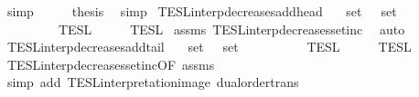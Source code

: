 \begin{isabellebody}
\ simp\isanewline
\ \ \isamarkupfalse%
\ \isamarkupfalse%
\ {\isacharquery}thesis\ \isamarkupfalse%
\ simp\isanewline
{}\isamarkupfalse%
%
\endisatagproof
{\isafoldproof}%
%
\isadelimproof
\isanewline
%
\endisadelimproof
\isanewline
{}\isamarkupfalse%
\ TESL{\isacharunderscore}interp{\isacharunderscore}decreases{\isacharunderscore}add{\isacharunderscore}head{\isacharcolon}\isanewline
\ \ \ {\isacartoucheopen}set\ {\isasymPhi}\ {\isasymsubseteq}\ set\ {\isasymPhi}{\isacharprime}{\isacartoucheclose}\isanewline
\ \ \ \ \ {\isacartoucheopen}{\isasymlbrakk}{\isasymlbrakk}\ {\isasymphi}\ {\isacharhash}\ {\isasymPhi}\ {\isasymrbrakk}{\isasymrbrakk}\isactrlsub T\isactrlsub E\isactrlsub S\isactrlsub L\ {\isasymsupseteq}\ {\isasymlbrakk}{\isasymlbrakk}\ {\isasymphi}\ {\isacharhash}\ {\isasymPhi}{\isacharprime}\ {\isasymrbrakk}{\isasymrbrakk}\isactrlsub T\isactrlsub E\isactrlsub S\isactrlsub L{\isacartoucheclose}\isanewline
%
\isadelimproof
%
\endisadelimproof
%
\isatagproof
{}\isamarkupfalse%
\ assms\ TESL{\isacharunderscore}interp{\isacharunderscore}decreases{\isacharunderscore}setinc\ \isamarkupfalse%
\ auto%
\endisatagproof
{\isafoldproof}%
%
\isadelimproof
\isanewline
%
\endisadelimproof
\isanewline
{}\isamarkupfalse%
\ TESL{\isacharunderscore}interp{\isacharunderscore}decreases{\isacharunderscore}add{\isacharunderscore}tail{\isacharcolon}\isanewline
\ \ \ {\isacartoucheopen}set\ {\isasymPhi}\ {\isasymsubseteq}\ set\ {\isasymPhi}{\isacharprime}{\isacartoucheclose}\isanewline
\ \ \ \ \ {\isacartoucheopen}{\isasymlbrakk}{\isasymlbrakk}\ {\isasymPhi}\ {\isacharat}\ {\isacharbrackleft}{\isasymphi}{\isacharbrackright}\ {\isasymrbrakk}{\isasymrbrakk}\isactrlsub T\isactrlsub E\isactrlsub S\isactrlsub L\ {\isasymsupseteq}\ {\isasymlbrakk}{\isasymlbrakk}\ {\isasymPhi}{\isacharprime}\ {\isacharat}\ {\isacharbrackleft}{\isasymphi}{\isacharbrackright}\ {\isasymrbrakk}{\isasymrbrakk}\isactrlsub T\isactrlsub E\isactrlsub S\isactrlsub L{\isacartoucheclose}\isanewline
%
\isadelimproof
%
\endisadelimproof
%
\isatagproof
{}\isamarkupfalse%
\ TESL{\isacharunderscore}interp{\isacharunderscore}decreases{\isacharunderscore}setinc{\isacharbrackleft}OF\ assms{\isacharbrackright}\ \isanewline
\ \ \isamarkupfalse%
\ {\isacharparenleft}simp\ add{\isacharcolon}\ TESL{\isacharunderscore}interpretation{\isacharunderscore}image\ dual{\isacharunderscore}order{\isachardot}trans{\isacharparenright}%

\end{isabellebody}
